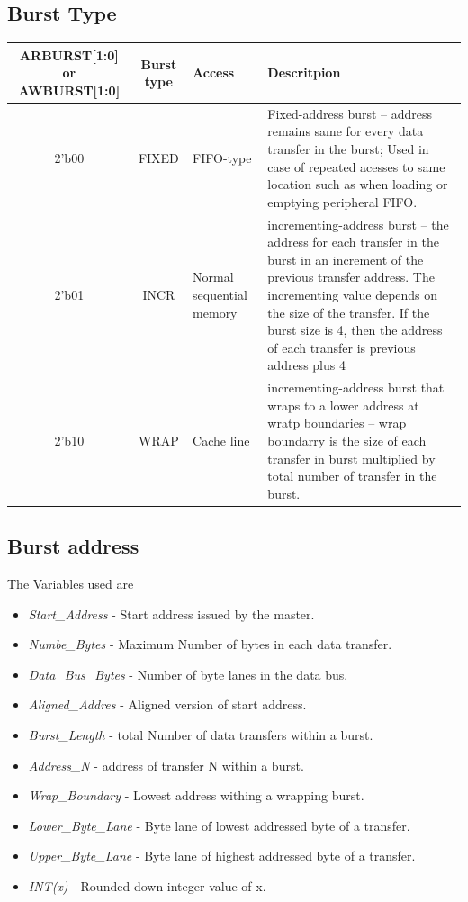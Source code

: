 \documentclass{article}
\begin{document}
\subsection{Burst Type}
\begin{table}[H]
    \begin{center}
        \begin{tabular}{c|c|p{2cm}|p{6.5cm}}
            \textbf{ARBURST[1:0] or AWBURST[1:0]} & \textbf{Burst type} & \textbf{Access} & \textbf{Descritpion}\\
            \hline
            2'b00 & FIXED & FIFO-type & Fixed-address burst -- address remains same for every data transfer in the burst; Used in case of repeated acesses to same location such as when loading or emptying  peripheral FIFO.\\
            2'b01 & INCR & Normal sequential memory & incrementing-address burst -- the address for each transfer in the burst in an increment of the previous transfer address. The incrementing value depends on the size of the transfer. If the burst size is 4, then the address of each transfer is previous address plus 4\\
            2'b10 & WRAP & Cache line & incrementing-address burst that wraps to a lower address at wratp boundaries -- wrap boundarry is the size of each transfer in burst multiplied by total number of transfer in the burst.\\
        \end{tabular}
    \end{center}
\end{table}

\subsection{Burst address}
\quad The Variables used are
\begin{itemize}
    \item \emph{Start\_Address} - Start address issued by the master.
    \item \emph{Numbe\_Bytes} - Maximum Number of bytes in each data transfer.
    \item \emph{Data\_Bus\_Bytes} - Number of byte lanes in the data bus.
    \item \emph{Aligned\_Addres} - Aligned version of start address.
    \item \emph{Burst\_Length} - total Number of data transfers within a burst.
    \item \emph{Address\_N} - address of transfer N within a burst.
    \item \emph{Wrap\_Boundary} - Lowest address withing a wrapping burst.
    \item \emph{Lower\_Byte\_Lane} - Byte lane of lowest addressed byte of a transfer.
    \item \emph{Upper\_Byte\_Lane} - Byte lane of highest addressed byte of a transfer.
    \item \emph{INT(x)} - Rounded-down integer value of x.
\end{itemize}
\end{document}
